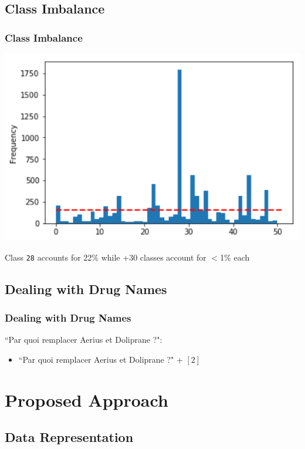 \documentclass{beamer}
\begin{document}
\subsection{Class Imbalance}

\begin{frame}
\frametitle{Class Imbalance}

\centering
\includegraphics[width=0.7\linewidth]{images/intent_hist}

Class \texttt{28} accounts for 22\% while +30 classes account for $<$1\% each

\end{frame}

\subsection{Dealing with Drug Names}

\begin{frame}
\frametitle{Dealing with Drug Names}

``Par quoi remplacer Aerius et Doliprane ?":
\begin{itemize}
\item ``Par quoi remplacer Aerius et Doliprane ?" + $[2]$
\end{itemize}

\end{frame}

\section{Proposed Approach}

\subsection{Data Representation}
\end{document}
